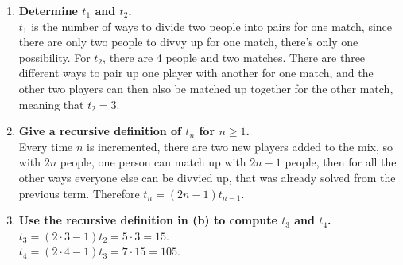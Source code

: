 \documentclass[10pt]{article}
\begin{document}
\begin{enumerate}[label=(\alph*)]
    \item \textbf{Determine $t_1$ and $t_2$.} \\
        $t_1$ is the number of ways to divide two people into pairs for one match, since there are only two people to divvy up for one match, there's 
        only one possibility.  For $t_2$, there are 4 people and two matches.  There are three different ways to pair up one player with another for one
        match, and the other two players can then also be matched up together for the other match, meaning that $t_2 = 3$.

    \item \textbf{Give a recursive definition of $t_n$ for $n \geq 1$.} \\
        Every time $n$ is incremented, there are two new players added to the mix, so with $2n$ people, one person can match up with $2n - 1$ people, then 
        for all the other ways everyone else can be divvied up, that was already solved from the previous term.  Therefore $t_n = (2n-1)t_{n-1}$.

    \item \textbf{Use the recursive definition in (b) to compute $t_3$ and $t_4$.} \\
        $t_3 = (2\cdot3 - 1)t_2 = 5 \cdot 3 = 15$. \\
        $t_4 = (2\cdot4 - 1)t_3 = 7 \cdot 15 = 105$.

\end{enumerate}
\end{document}
